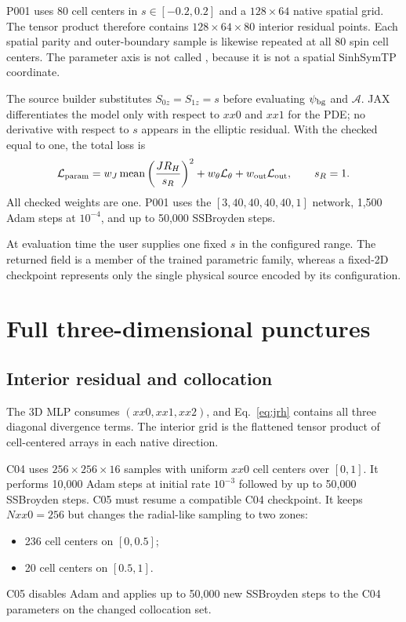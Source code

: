 \documentclass[11pt]{article}
\newcommand{\code}[1]{\texttt{\detokenize{#1}}}
\newcommand{\mean}{\operatorname{mean}}
\newcommand{\JRH}{J R_H}
\begin{document}
P001 uses 80 cell centers in $s\in[-0.2,0.2]$ and a
$128\times64$ native spatial grid.  The tensor product therefore contains
$128\times64\times80$ interior residual points.  Each spatial parity and
outer-boundary sample is likewise repeated at all 80 spin cell centers.  The
parameter axis is not called \code{Nxx2}, because it is not a spatial
SinhSymTP coordinate.

The source builder substitutes $S_{0z}=S_{1z}=s$ before evaluating
$\psi_{\rm bg}$ and $\mathcal{A}$.  JAX differentiates the model only with
respect to $xx0$ and $xx1$ for the PDE; no derivative with respect to $s$
appears in the elliptic residual.  With the checked
\code{regularized_residual_scale} equal to one, the total loss is
\begin{equation}
 \mathcal{L}_{\rm param}=
 w_J\mean\left(\frac{\JRH}{s_R}\right)^2
 +w_{\theta}\mathcal{L}_{\theta}
 +w_{\rm out}\mathcal{L}_{\rm out},
 \qquad s_R=1.
 \label{eq:parametric-loss}
\end{equation}
All checked weights are one.  P001 uses the
$[3,40,40,40,40,1]$ network, 1,500 Adam steps at $10^{-4}$, and up to 50,000
SSBroyden steps.

At evaluation time the user supplies one fixed $s$ in the configured range.
The returned field is a member of the trained parametric family, whereas a
fixed-2D checkpoint represents only the single physical source encoded by its
configuration.

\section{Full three-dimensional punctures}

\subsection{Interior residual and collocation}

The 3D MLP consumes $(xx0,xx1,xx2)$, and Eq.~\eqref{eq:jrh} contains all three
diagonal divergence terms.  The interior grid is the flattened tensor product
of cell-centered arrays in each native direction.

C04 uses $256\times256\times16$ samples with uniform $xx0$ cell centers over
$[0,1]$.  It performs 10,000 Adam steps at initial rate $10^{-3}$ followed by
up to 50,000 SSBroyden steps.  C05 must resume a compatible C04 checkpoint.
It keeps $Nxx0=256$ but changes the radial-like sampling to two zones:
\begin{itemize}[nosep]
  \item 236 cell centers on $[0,0.5]$;
  \item 20 cell centers on $[0.5,1]$.
\end{itemize}
C05 disables Adam and applies up to 50,000 new SSBroyden steps to the C04
parameters on the changed collocation set.
\end{document}
